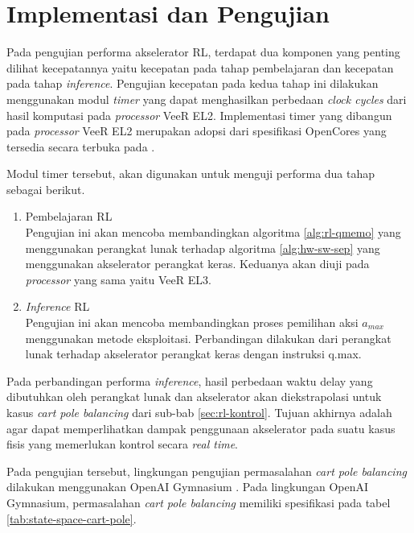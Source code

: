 \chapter{Implementasi dan Pengujian}

Pada pengujian performa akselerator \ac{RL}, terdapat dua komponen yang penting dilihat kecepatannya yaitu kecepatan pada tahap pembelajaran dan kecepatan pada tahap \textit{inference}. Pengujian kecepatan pada kedua tahap ini dilakukan menggunakan modul \textit{timer} yang dapat menghasilkan perbedaan \textit{clock cycles} dari hasil komputasi pada \textit{processor} VeeR EL2. Implementasi timer yang dibangun pada \textit{processor} VeeR EL2 merupakan adopsi dari spesifikasi OpenCores yang tersedia secara terbuka pada \parencite{open2024ptc}.

Modul timer tersebut, akan digunakan untuk menguji performa dua tahap sebagai berikut.

\begin{enumerate}
	\item Pembelajaran \acl{RL}\\
	      Pengujian ini akan mencoba membandingkan algoritma \ref{alg:rl-qmemo} yang menggunakan perangkat lunak terhadap algoritma \ref{alg:hw-sw-sep} yang menggunakan akselerator perangkat keras. Keduanya akan diuji pada \textit{processor} yang sama yaitu VeeR EL3.
	\item \textit{Inference} \acl{RL}\\
	      Pengujian ini akan mencoba membandingkan proses pemilihan aksi $a_{max}$ menggunakan metode eksploitasi. Perbandingan dilakukan dari perangkat lunak terhadap akselerator perangkat keras dengan instruksi q.max.
\end{enumerate}

Pada perbandingan performa \textit{inference}, hasil perbedaan waktu delay yang dibutuhkan oleh perangkat lunak dan akselerator akan diekstrapolasi untuk kasus \textit{cart pole balancing} dari sub-bab \ref{sec:rl-kontrol}. Tujuan akhirnya adalah agar dapat memperlihatkan dampak penggunaan akselerator pada suatu kasus fisis yang memerlukan kontrol secara \textit{real time}.

Pada pengujian tersebut, lingkungan pengujian permasalahan \textit{cart pole balancing} dilakukan menggunakan OpenAI Gymnasium \parencite{towers2023gymnasium}. Pada lingkungan OpenAI Gymnasium, permasalahan \textit{cart pole balancing} memiliki spesifikasi pada tabel \ref{tab:state-space-cart-pole}.

